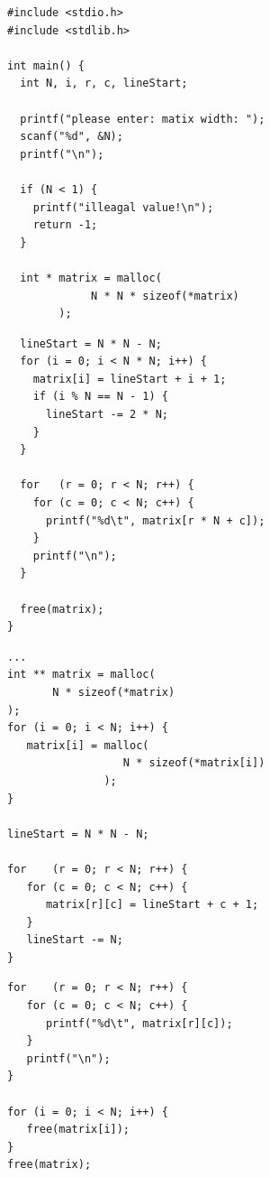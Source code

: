 \begin{frame}[fragile]
%
%
\begin{codebox}
\begin{verbatim}
#include <stdio.h>
#include <stdlib.h>

int main() {
  int N, i, r, c, lineStart;
	
  printf("please enter: matix width: ");
  scanf("%d", &N);
  printf("\n");
	
  if (N < 1) {
    printf("illeagal value!\n");
    return -1;
  }
	
  int * matrix = malloc(
             N * N * sizeof(*matrix)
        );
\end{verbatim}
\end{codebox}
%
\begin{codebox}[...Fortsetzung]
\begin{verbatim}
  lineStart = N * N - N;
  for (i = 0; i < N * N; i++) {
    matrix[i] = lineStart + i + 1;
    if (i % N == N - 1) {
      lineStart -= 2 * N;
    }
  }
	
  for   (r = 0; r < N; r++) {
    for (c = 0; c < N; c++) {
      printf("%d\t", matrix[r * N + c]);
    }
    printf("\n");
  }

  free(matrix);
}
\end{verbatim}
\end{codebox}
%
\end{frame}


\begin{frame}[fragile]
%
%
\begin{codebox}
\begin{verbatim}
...
int ** matrix = malloc(
       N * sizeof(*matrix)
);
for (i = 0; i < N; i++) {
   matrix[i] = malloc(
                  N * sizeof(*matrix[i])
               );
}

lineStart = N * N - N;

for    (r = 0; r < N; r++) {
   for (c = 0; c < N; c++) {
      matrix[r][c] = lineStart + c + 1;
   }
   lineStart -= N;
}
\end{verbatim}
\end{codebox}
%
\begin{codebox}[...Fortsetzung]
\begin{verbatim}
for    (r = 0; r < N; r++) {
   for (c = 0; c < N; c++) {
      printf("%d\t", matrix[r][c]);
   }
   printf("\n");
}

for (i = 0; i < N; i++) {
   free(matrix[i]);
}
free(matrix);
\end{verbatim}
\end{codebox}
%
\end{frame}

